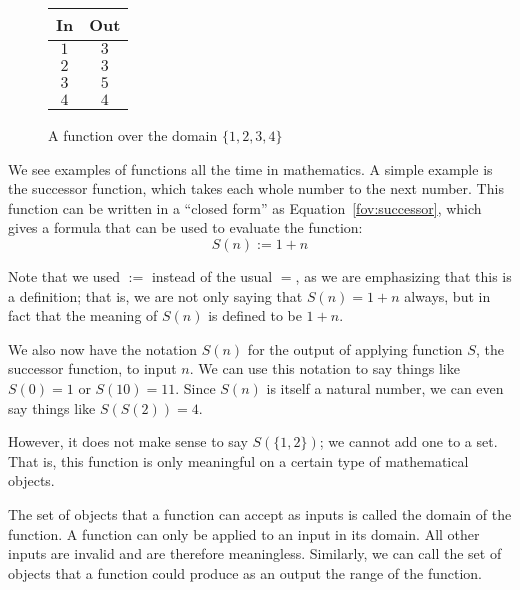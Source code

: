 \documentclass[a4paper,10pt]{report}
\begin{document}
\begin{figure}
  \renewcommand{\arraystretch}{1.2}
  \begin{tabular}{|c|c|}
    \hline
    \textbf{In} & \textbf{Out} \\
    \hline
    \(1\) & \(3\) \\
    \(2\) & \(3\) \\
    \(3\) & \(5\) \\
    \(4\) & \(4\) \\
    \hline
  \end{tabular}

  \caption{A function over the domain \(\{1, 2, 3, 4\}\)}
  \label{fov:numberfunction}
\end{figure}

We see examples of functions all the time in mathematics. A simple example is the successor
function, which takes each whole number to the next number. This function can be written in
a ``closed form'' as Equation~\ref{fov:successor}, which gives a formula that can be used to
evaluate the function:
\begin{equation}
  S(n) := 1+n
  \label{fov:successor}
\end{equation}

Note that we used \(:=\) instead of the usual \(=\), as we are emphasizing that this is a
definition; that is, we are not only saying that \(S(n) = 1+n\) always, but in fact that
the meaning of \(S(n)\) is defined to be \(1+n\).

We also now have the notation \(S(n)\) for the output of applying function \(S\), the
successor function, to input \(n\). We can use this notation to say things like \(S(0) = 1\)
or \(S(10) = 11\). Since \(S(n)\) is itself a natural number, we can even say things like
\(S(S(2)) = 4\).

However, it does not make sense to say \(S(\{1, 2\})\); we cannot add one to a set. That is,
this function is only meaningful on a certain type of mathematical objects.

The set of objects that a function can accept as inputs is called the \gls{domain} of the
function. A function can only be applied to an input in its domain. All other inputs are
invalid and are therefore meaningless. Similarly, we can call the set of objects that a
function could produce as an output the \gls{range} of the function.
\end{document}
